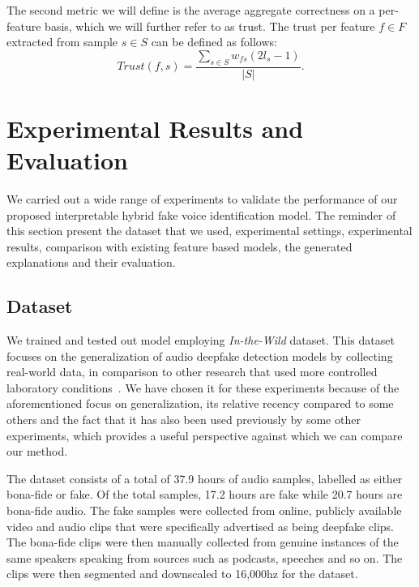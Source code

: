 \documentclass{article}
\begin{document}
The second metric we will define is the average aggregate correctness on a per-feature basis, which we will further refer to as trust. The trust per feature \(f \in F\) extracted from sample \(s \in S \) can be defined as follows:
\begin{equation}
    Trust(f, s) = \frac{\sum_{s \in S} w_{fs}(2l_{s}-1)}{|S|}.
\end{equation}
			
            
\section{Experimental Results and Evaluation} \label{sec:experimental_results}
We carried out a wide range of experiments to validate the performance of our proposed interpretable hybrid fake voice identification model. The reminder of this section present the dataset that we used, experimental settings, experimental results, comparison with existing feature based models, the generated explanations and their evaluation.

\subsection{Dataset}
We trained and tested out model employing \textit{In-the-Wild} dataset. This dataset focuses on the generalization of audio deepfake detection models by collecting real-world data, in comparison to other research that used more controlled laboratory conditions~\cite{muller_does_2022}. We have chosen it for these experiments because of the aforementioned focus on generalization, its relative recency compared to some others and the fact that it has also been used previously by some other experiments, which provides a useful perspective against which we can compare our method.

The dataset consists of a total of 37.9 hours of audio samples, labelled as either bona-fide or fake. Of the total samples, 17.2 hours are fake while 20.7 hours are bona-fide audio. The fake samples were collected from online, publicly available video and audio clips that were specifically advertised as being deepfake clips. The bona-fide clips were then manually collected from genuine instances of the same speakers speaking from sources such as podcasts, speeches and so on. The clips were then segmented and downscaled to 16,000hz for the dataset.
\end{document}
